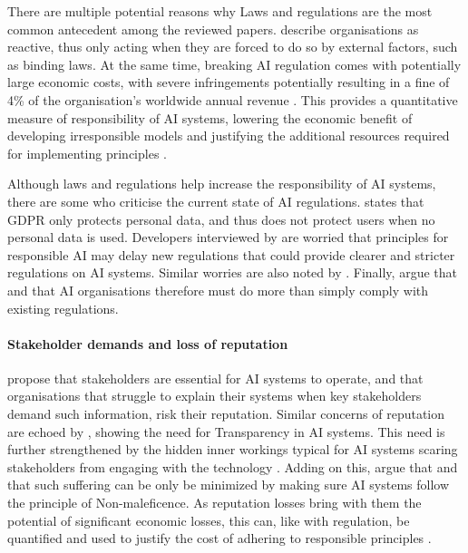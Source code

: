 There are multiple potential reasons why Laws and regulations are the most common antecedent among the reviewed papers. \textcite{Rakova_2021} describe organisations as reactive, thus only acting when they are forced to do so by external factors, such as binding laws. At the same time, breaking AI regulation comes with potentially large economic costs, with severe infringements potentially resulting in a fine of 4\% of the organisation's worldwide annual revenue \parencite{GDPR_fines}. This provides a quantitative measure of responsibility of AI systems, lowering the economic benefit of developing irresponsible models and justifying the additional resources required for implementing principles \parencite{Morley_2021}.

Although laws and regulations help increase the responsibility of AI systems, there are some who criticise the current state of AI regulations. \textcite{Chen_2020} states that GDPR only protects personal data, and thus does not protect users when no personal data is used. Developers interviewed by \textcite{Henriksen_2021} are worried that principles for responsible AI may delay new regulations that could provide clearer and stricter regulations on AI systems. Similar worries are also noted by \textcite{Hagendorff_2020}. Finally, \textcite[p.~694]{Floridi_2018} argue that  and that AI organisations therefore must do more than simply comply with existing regulations.


\paragraph{Stakeholder demands and loss of reputation}
\textcite{Buhmann_2021} propose that stakeholders are essential for AI systems to operate, and that organisations that struggle to explain their systems when key stakeholders demand such information, risk their reputation. Similar concerns of reputation are echoed by \textcite{Havrda_2020,Eitel-Porter_2021}, showing the need for Transparency in AI systems. This need is further strengthened by the hidden inner workings typical for AI systems scaring stakeholders from engaging with the technology \parencite{Merhi_2022}. Adding on this, \textcite[p.~1]{Clarke_2019} argue that  and that such suffering can be only be minimized by making sure AI systems follow the principle of Non-maleficence. As reputation losses bring with them the potential of significant economic losses, this can, like with regulation, be quantified and used to justify the cost of adhering to responsible principles \parencite{Hagendorff_2020}.


